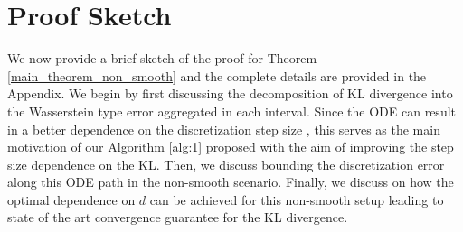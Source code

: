 \documentclass{article}
\begin{document}
 


\section{Proof Sketch}
\noindent
We now provide a brief sketch of the proof for Theorem \ref{main_theorem_non_smooth} and the complete details are provided in the Appendix. We begin by first discussing the decomposition of KL divergence into the Wasserstein type error aggregated in each interval. Since the ODE can result in a better dependence on the discretization step size \cite{chen2023probability}, this serves as the main motivation of our Algorithm \ref{alg:1} proposed with the aim of improving the step size dependence on the KL. Then, we discuss bounding the discretization error along this ODE path in the non-smooth scenario. Finally, we discuss on how the optimal dependence on $d$ can be achieved for this non-smooth setup leading to state of the art convergence guarantee for the KL divergence.
 
\end{document}
